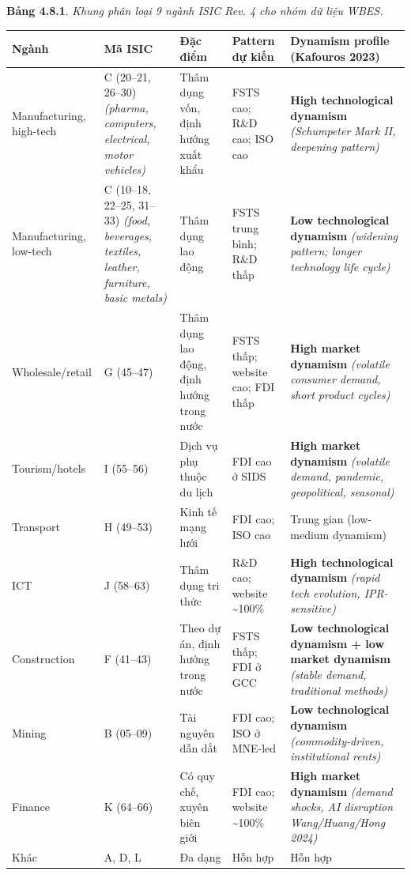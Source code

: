 \documentclass[12pt,a4paper]{article}
\begin{document}
\textbf{Bảng 4.8.1}. \emph{Khung phân loại 9 ngành ISIC Rev. 4 cho nhóm
dữ liệu WBES.}

\begin{longtable}[]{@{}lllll@{}}
\toprule\noalign{}
Ngành & Mã ISIC & Đặc điểm & Pattern dự kiến & \textbf{Dynamism profile
(Kafouros 2023)} \\
\midrule\noalign{}
\endhead
\bottomrule\noalign{}
\endlastfoot
Manufacturing, high-tech & C (20--21, 26--30) \emph{(pharma, computers,
electrical, motor vehicles)} & Thâm dụng vốn, định hướng xuất khẩu &
FSTS cao; R\&D cao; ISO cao & \textbf{High technological dynamism}
\emph{(Schumpeter Mark II, deepening pattern)} \\
Manufacturing, low-tech & C (10--18, 22--25, 31--33) \emph{(food,
beverages, textiles, leather, furniture, basic metals)} & Thâm dụng lao
động & FSTS trung bình; R\&D thấp & \textbf{Low technological dynamism}
\emph{(widening pattern; longer technology life cycle)} \\
Wholesale/retail & G (45--47) & Thâm dụng lao động, định hướng trong
nước & FSTS thấp; website cao; FDI thấp & \textbf{High market dynamism}
\emph{(volatile consumer demand, short product cycles)} \\
Tourism/hotels & I (55--56) & Dịch vụ phụ thuộc du lịch & FDI cao ở SIDS
& \textbf{High market dynamism} \emph{(volatile demand, pandemic,
geopolitical, seasonal)} \\
Transport & H (49--53) & Kinh tế mạng lưới & FDI cao; ISO cao & Trung
gian (low-medium dynamism) \\
ICT & J (58--63) & Thâm dụng tri thức & R\&D cao; website
\textasciitilde100\% & \textbf{High technological dynamism} \emph{(rapid
tech evolution, IPR-sensitive)} \\
Construction & F (41--43) & Theo dự án, định hướng trong nước & FSTS
thấp; FDI ở GCC & \textbf{Low technological dynamism + low market
dynamism} \emph{(stable demand, traditional methods)} \\
Mining & B (05--09) & Tài nguyên dẫn dắt & FDI cao; ISO ở MNE-led &
\textbf{Low technological dynamism} \emph{(commodity-driven,
institutional rents)} \\
Finance & K (64--66) & Có quy chế, xuyên biên giới & FDI cao; website
\textasciitilde100\% & \textbf{High market dynamism} \emph{(demand
shocks, AI disruption Wang/Huang/Hong 2024)} \\
Khác & A, D, L & Đa dạng & Hỗn hợp & Hỗn hợp \\
\end{longtable}
\end{document}
